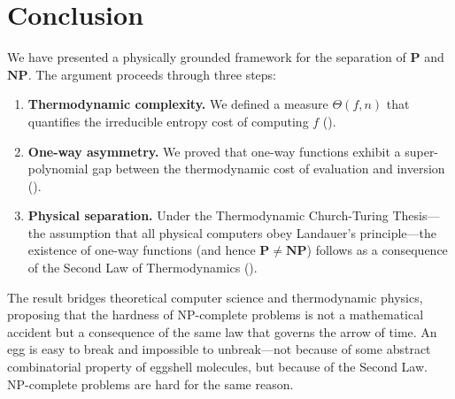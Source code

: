 \documentclass[12pt, a4paper]{article}
\newcommand{\Pc}{\mathbf{P}}
\newcommand{\NPc}{\mathbf{NP}}
\theoremstyle{plain}
\theoremstyle{definition}
\theoremstyle{remark}
\begin{document}
\section{Conclusion}\label{sec:conclusion}

We have presented a physically grounded framework for the separation of
$\Pc$ and $\NPc$. The argument proceeds through three steps:

\begin{enumerate}
  \item \textbf{Thermodynamic complexity.} We defined a measure $\Theta(f,n)$
    that quantifies the irreducible entropy cost of computing $f$
    ().
  \item \textbf{One-way asymmetry.} We proved that one-way functions
    exhibit a super-polynomial gap between the thermodynamic cost of
    evaluation and inversion ().
  \item \textbf{Physical separation.} Under the Thermodynamic Church-Turing
    Thesis---the assumption that all physical computers obey Landauer's
    principle---the existence of one-way functions (and hence
    $\Pc \neq \NPc$) follows as a consequence of the Second Law of
    Thermodynamics ().
\end{enumerate}

The result bridges theoretical computer science and thermodynamic physics,
proposing that the hardness of NP-complete problems is not a mathematical
accident but a consequence of the same law that governs the arrow of time.
An egg is easy to break and impossible to unbreak---not because of some
abstract combinatorial property of eggshell molecules, but because of
the Second Law. NP-complete problems are hard for the same reason.


\vspace{2em}
\noindent\hrulefill
\vspace{1em}






\end{document}
